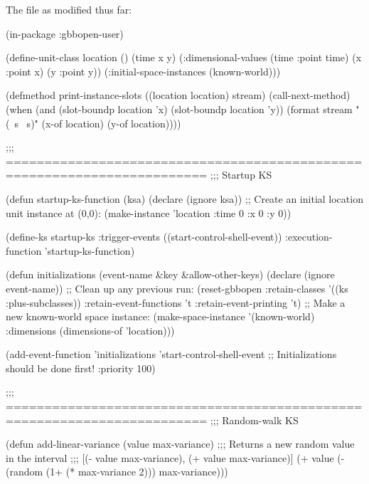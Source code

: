 \documentclass[10pt,twoside,english,pdftex]{article}
\begin{document}
\begin{tightitemize}
\item The  file as modified thus far:
\end{tightitemize}

\begin{example}
  (in-package :gbbopen-user)

  (define-unit-class location ()
    (time 
     x y)
    (:dimensional-values
      (time :point time)
      (x :point x)
      (y :point y))
    (:initial-space-instances (known-world)))

  (defmethod print-instance-slots ((location location) stream)
    (call-next-method)
    (when (and (slot-boundp location 'x)
               (slot-boundp location 'y))
      (format stream " (~s ~s)"
              (x-of location)
              (y-of location))))

  ;;; ========================================================================
  ;;;   Startup KS

  (defun startup-ks-function (ksa)
    (declare (ignore ksa))
    ;; Create an initial location unit instance at (0,0):
    (make-instance 'location :time 0 :x 0 :y 0))

  (define-ks startup-ks
      :trigger-events ((start-control-shell-event))
      :execution-function 'startup-ks-function)

  (defun initializations (event-name &key &allow-other-keys)
    (declare (ignore event-name))
    ;; Clean up any previous run:
    (reset-gbbopen :retain-classes '((ks :plus-subclasses))
                   :retain-event-functions 't
                   :retain-event-printing 't)
    ;; Make a new known-world space instance:
    (make-space-instance 
     '(known-world)
     :dimensions (dimensions-of 'location)))

  (add-event-function 'initializations 'start-control-shell-event
                      ;; Initializations should be done first!
                      :priority 100)

  ;;; ========================================================================
  ;;;   Random-walk KS

  (defun add-linear-variance (value max-variance)
    ;;; Returns a new random value in the interval
    ;;; [(- value max-variance), (+ value max-variance)]
    (+ value (- (random (1+ (* max-variance 2))) max-variance)))


\end{example}
\end{document}

